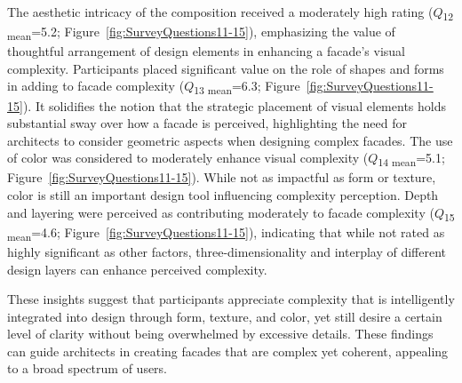 The aesthetic intricacy of the composition received a moderately high rating (\(Q\)\textsubscript{\small{12 mean}}=5.2; Figure~\ref{fig:SurveyQuestions11-15}), emphasizing the value of thoughtful arrangement of design elements in enhancing a facade's visual complexity.
Participants placed significant value on the role of shapes and forms in adding to facade complexity (\(Q\)\textsubscript{\small{13 mean}}=6.3; Figure~\ref{fig:SurveyQuestions11-15}).
It solidifies the notion that the strategic placement of visual elements holds substantial sway over how a facade is perceived, highlighting the need for architects to consider geometric aspects when designing complex facades.
The use of color was considered to moderately enhance visual complexity (\(Q\)\textsubscript{\small{14 mean}}=5.1; Figure~\ref{fig:SurveyQuestions11-15}). While not as impactful as form or texture, color is still an important design tool influencing complexity perception.
Depth and layering were perceived as contributing moderately to facade complexity (\(Q\)\textsubscript{\small{15 mean}}=4.6; Figure~\ref{fig:SurveyQuestions11-15}), indicating that while not rated as highly significant as other factors, three-dimensionality and interplay of different design layers can enhance perceived complexity.

These insights suggest that participants appreciate complexity that is intelligently integrated into design through form, texture, and color, yet still desire a certain level of clarity without being overwhelmed by excessive details.
These findings can guide architects in creating facades that are complex yet coherent, appealing to a broad spectrum of users.

